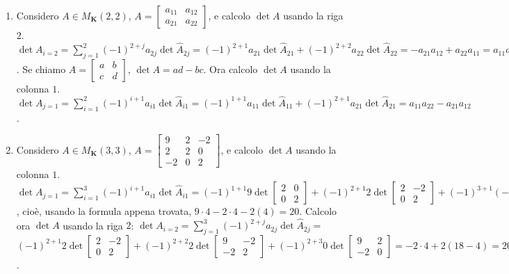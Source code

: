 \documentclass{article}
\begin{document}
\begin{enumerate}
\item Considero $A\in M_{\mathbf{K}}\left( 2,2\right) $, $A=\left[ 
\begin{array}{cc}
a_{11} & a_{12} \\ 
a_{21} & a_{22}%
\end{array}%
\right] $, e calcolo $\det A$ usando la riga $2$. $\det
A_{i=2}=\sum_{j=1}^{2}\left( -1\right) ^{2+j}a_{2j}\det \hat{A}_{2j}=\left(
-1\right) ^{2+1}a_{21}\det \hat{A}_{21}+\left( -1\right) ^{2+2}a_{22}\det 
\hat{A}_{22}=-a_{21}a_{12}+a_{22}a_{11}=a_{11}a_{22}-a_{12}a_{21}$. Se
chiamo $A=\left[ 
\begin{array}{cc}
a & b \\ 
c & d%
\end{array}%
\right] $, $\det A=ad-bc$. Ora calcolo $\det A$ usando la colonna $1$. $\det
A_{j=1}=\sum_{i=1}^{2}\left( -1\right) ^{i+1}a_{i1}\det \hat{A}_{i1}=\left(
-1\right) ^{1+1}a_{11}\det \hat{A}_{11}+\left( -1\right) ^{2+1}a_{21}\det 
\hat{A}_{21}=a_{11}a_{22}-a_{21}a_{12}$.

\item Considero $A\in M_{\mathbf{K}}\left( 3,3\right) $, $A=\left[ 
\begin{array}{ccc}
9 & 2 & -2 \\ 
2 & 2 & 0 \\ 
-2 & 0 & 2%
\end{array}%
\right] $, e calcolo $\det A$ usando la colonna $1$. $\det
A_{j=1}=\sum_{i=1}^{3}\left( -1\right) ^{i+1}a_{i1}\det \hat{A}_{i1}=\left(
-1\right) ^{1+1}9\det \left[ 
\begin{array}{cc}
2 & 0 \\ 
0 & 2%
\end{array}%
\right] +\left( -1\right) ^{2+1}2\det \left[ 
\begin{array}{cc}
2 & -2 \\ 
0 & 2%
\end{array}%
\right] +\left( -1\right) ^{3+1}\left( -2\right) \det \left[ 
\begin{array}{cc}
2 & -2 \\ 
2 & 0%
\end{array}%
\right] $, cio\`{e}, usando la formula appena trovata, $9\cdot 4-2\cdot
4-2\left( 4\right) =20$. Calcolo ora $\det A$ usando la riga $2$: $\det
A_{i=2}=\sum_{j=1}^{3}\left( -1\right) ^{2+j}a_{2j}\det \hat{A}_{2j}=$ $%
\left( -1\right) ^{2+1}2\det \left[ 
\begin{array}{cc}
2 & -2 \\ 
0 & 2%
\end{array}%
\right] +\left( -1\right) ^{2+2}2\det \left[ 
\begin{array}{cc}
9 & -2 \\ 
-2 & 2%
\end{array}%
\right] +\left( -1\right) ^{2+3}0\det \left[ 
\begin{array}{cc}
9 & 2 \\ 
-2 & 0%
\end{array}%
\right] =-2\cdot 4+2\left( 18-4\right) =20$.
\end{enumerate}
\end{document}
